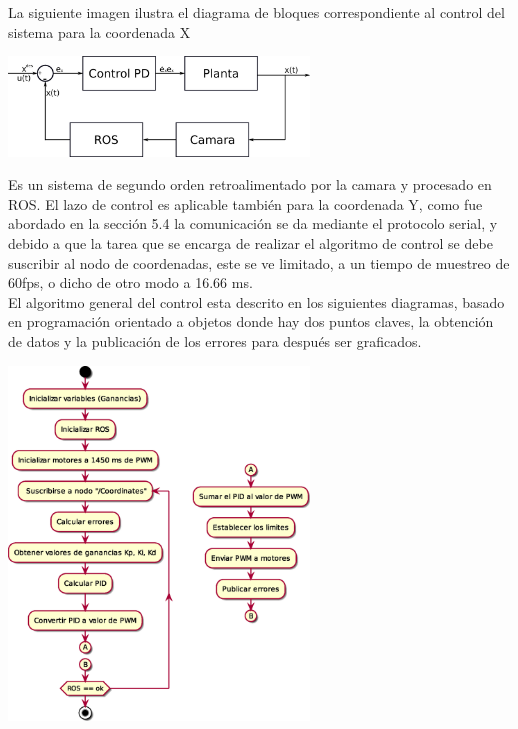 La siguiente imagen ilustra el diagrama de bloques correspondiente al control del sistema para la coordenada X
\begin{center}
	\includegraphics[width=0.6\textwidth]{Contenido/Cuerpo/Capitulo5/Fig6.eps}
	\label{Fig4}
\end{center}
Es un sistema de segundo orden retroalimentado por la camara y procesado en ROS. El lazo de control es aplicable también para la coordenada Y, como 
fue abordado en la sección 5.4 la comunicación se da mediante
el protocolo serial, y debido a que la tarea que se encarga de realizar el algoritmo de control se debe suscribir al nodo de
coordenadas, este se ve limitado, a un tiempo de muestreo de 60fps, o dicho de otro modo a 16.66 ms.\\
El algoritmo general del control esta descrito en los siguientes diagramas, basado en programación orientado a objetos
donde hay dos puntos claves, la obtención de datos y la publicación de los errores para después ser graficados.
\begin{center}
	\includegraphics[width=0.6\textwidth]{Contenido/Cuerpo/Capitulo5/Fig7.eps}
	\label{Fig4}
\end{center}


